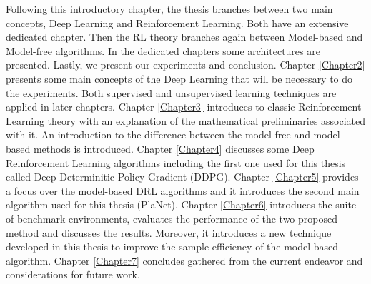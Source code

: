 Following this introductory chapter, the thesis branches between two main concepts, Deep Learning and Reinforcement Learning. Both have an extensive dedicated chapter. Then the RL theory branches again between Model-based and Model-free algorithms. In the dedicated chapters some architectures are presented. Lastly, we present our experiments and conclusion. Chapter \ref{Chapter2} presents some main concepts of the Deep Learning that will be necessary to do the experiments. Both supervised and unsupervised learning techniques are applied in later chapters. Chapter \ref{Chapter3} introduces to classic Reinforcement Learning theory with an explanation of the mathematical preliminaries associated with it. An introduction to the difference between the model-free and model-based methods is introduced. Chapter \ref{Chapter4} discusses some Deep Reinforcement Learning algorithms including the first one used for this thesis called Deep Determinitic Policy Gradient (DDPG). Chapter \ref{Chapter5} provides a focus over the model-based DRL algorithms and it introduces the second main algorithm used for this thesis (PlaNet). Chapter \ref{Chapter6} introduces the suite of benchmark environments, evaluates the performance of the two proposed method and discusses the results. Moreover, it introduces a new technique developed in this thesis to improve the sample efficiency of the model-based algorithm. Chapter \ref{Chapter7} concludes gathered from the current endeavor and considerations for future work.











